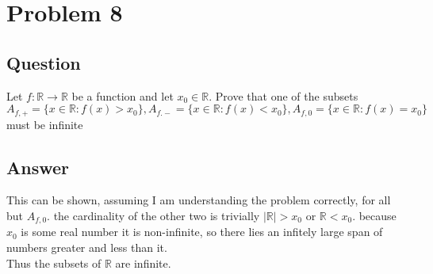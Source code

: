 \documentclass{article}
\begin{document}
\section*{Problem 8}
\subsection*{Question}
Let \(f: \mathbb{R} \to \mathbb{R}\) be a function and let \(x_{0} \in \mathbb{R}\). Prove that one of the subsets 
\\ \hspace*{0.25cm} \(A_{f,+} = \{x \in \mathbb{R} : f(x) >x_{0}\}, A_{f.-} = \{x \in \mathbb{R} : f(x) < x_{0}\}, A_{f,0} = \{x \in \mathbb{R} : f(x) = x_{0}\}\) \\ must be infinite
\subsection*{Answer}
This can be shown, assuming I am understanding the problem correctly, for all but \(A_{f,0}\). the cardinality of the other two is trivially \(|\mathbb{R}| > x_{0}\) or \(\mathbb{R} < x_{0}\). because \(x_{0}\) is some real number it is non-infinite, so there lies an infitely large span of numbers greater and less than it. \\ Thus the subsets of \(\mathbb {R}\) are infinite.
\end{document}
